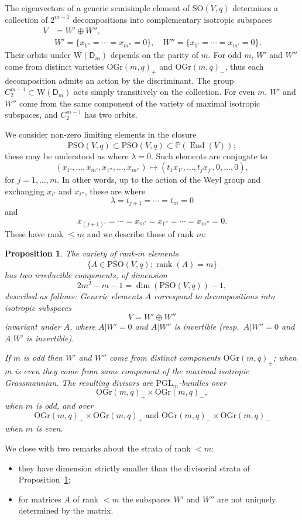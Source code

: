 \documentclass[12pt]{amsart}
\numberwithin{equation}{section}
\newcommand{\bP}{\mathbb{P}}
\newcommand{\End}{\operatorname{End}}
\newcommand{\OGr}{\mathrm{OGr}}
\newcommand{\oPSO}{\overline{\mathrm{PSO}}}
\newcommand{\PGL}{\mathrm{PGL}}
\newcommand{\PSO}{\mathrm{PSO}}
\newcommand{\SO}{\mathrm{SO}}
\theoremstyle{plain}
\newtheorem{prop}{Proposition}[section]
\theoremstyle{definition}
\theoremstyle{remark}
\begin{document}
The eigenvectors of a generic semisimple element of $\SO(V,q)$ determines a
collection of $2^{m-1}$ decompositions into complementary isotropic subspaces
\begin{align*}
V &= W' \oplus W'',\\
   &W'=\{x_{1''}= \cdots = x_{m''}=0\}, \quad 
    W''=\{x_{1'}=\cdots = x_{m'}=0\}.
\end{align*}
Their orbits under $\mathrm W(\mathsf D_m)$ depends on the parity of $m$.
For odd $m$, $W'$ and $W''$ come from distinct varieties
$\OGr(m,q)_+$ and $\OGr(m,q)_-$, thus each decomposition admits
an action by the discriminant. The group $C_2^{m-1} \subset
\mathrm W(\mathsf D_m)$ acts simply transitively on the collection.
For even $m$, $W'$ and $W''$ come from the same component
of the variety of maximal isotropic subspaces, and 
$C_2^{m-1}$ has two orbits.

We consider non-zero limiting elements in the closure 
$$\PSO(V,q) \subset \oPSO(V,q) \subset \bP(\End(V));$$
these may be understood as where $\lambda =0$. 
Such elements are conjugate to
$$(x_{1'},\ldots,x_{m'},x_{1''},\ldots,x_{m''}) \mapsto
(t_1x_{1'},\ldots,t_jx_{j'},0, \ldots, 0),$$
for $j=1,\ldots,m$.
In other words, up to the action of the Weyl group 
and exchanging $x_{i'}$ and $x_{i''}$, these are where 
$$\lambda=t_{j+1}=\cdots=t_m=0$$
and
$$x_{(j+1)'}=\cdots = x_{m'}=x_{1''}=\cdots=x_{m''}=0.$$
These have rank $\le m$ and we describe those of rank $m$:

\begin{prop} \label{prop:Dm-1Dm}
The variety of rank-$m$ elements 
$$\{A \in \oPSO(V,q): \operatorname{rank}(A)=m \}$$
has two irreducible components, of dimension 
$$2m^2-m-1=\dim(\PSO(V,q))-1,$$ 
described as follows:
Generic elements $A$ correspond
to decompositions into isotropic subspaces
$$V=W' \oplus W''$$
invariant under $A$,
where $A|W'=0$ and $A|W''$ is invertible
(resp.~$A|W''=0$ and $A|W'$ is invertible).

If $m$ is odd then $W'$ and $W''$ come from distinct 
components $\OGr(m,q)_{\pm}$; when $m$ is even they come from
same component of the maximal isotropic Grassmannian. 
The resulting divisors are $\PGL_m$-bundles over
$$\OGr(m,q)_+ \times \OGr(m,q)_-,$$
when $m$ is odd, and over
$$\OGr(m,q)_+ \times \OGr(m,q)_+ \text{ and }
\OGr(m,q)_- \times \OGr(m,q)_-$$
when $m$ is even.
\end{prop}

We close with two remarks about the strata of rank $<m$:
\begin{itemize}
\item{they have dimension strictly smaller than the divisorial
strata of Proposition~\ref{prop:Dm-1Dm};}
\item{for matrices $A$ of rank $<m$ the subspaces 
$W'$ and $W''$ are not uniquely determined by the matrix.}
\end{itemize}
\end{document}
